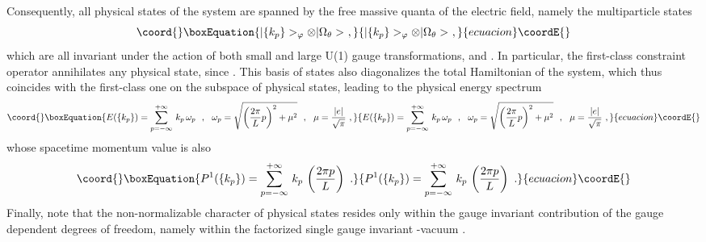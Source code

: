 \documentclass[a4paper,11pt]{article}
\begin{document}
Consequently, all physical states of the system are spanned by the
free massive quanta of the electric field, namely the multiparticle states
\begin{equation}\coord{}\boxEquation{
|\{k_p\}>_\varphi\otimes|\Omega_\theta>\ ,
}{
|\{k_p\}>_\varphi\otimes|\Omega_\theta>\ ,
}{ecuacion}\coordE{}\end{equation}
which are all invariant under the action of both small and large U(1) gauge
transformations, \coordHE{} and \coordHE{}. In particular, the first-class 
constraint ope\-ra\-tor \coordHE{} annihilates any physical state, since
\coordHE{}.
This basis of states also diagonalizes the total Hamiltonian \coordHE{} of the
system, which thus coincides with the first-class one \coordHE{} on the subspace
of physical states, leading to the physical energy spectrum
\begin{equation}\coord{}\boxEquation{
E(\{k_p\})=\sum_{p=-\infty}^{+\infty}\,k_p\,\omega_p\ \ ,\ \ 
\omega_p=\sqrt{\left(\frac{2\pi}{L}p\right)^2+\mu^2}\ \ ,\ \ 
\mu=\frac{|e|}{\sqrt{\pi}}\ ,
}{
E(\{k_p\})=\sum_{p=-\infty}^{+\infty}\,k_p\,\omega_p\ \ ,\ \ 
\omega_p=\sqrt{\left(\frac{2\pi}{L}p\right)^2+\mu^2}\ \ ,\ \ 
\mu=\frac{|e|}{\sqrt{\pi}}\ ,
}{ecuacion}\coordE{}\end{equation}
whose spacetime momentum value is also
\begin{equation}\coord{}\boxEquation{
P^1(\{k_p\})=\sum_{p=-\infty}^{+\infty}\,k_p\,\left(\frac{2\pi p}{L}\right)\ .
}{
P^1(\{k_p\})=\sum_{p=-\infty}^{+\infty}\,k_p\,\left(\frac{2\pi p}{L}\right)\ .
}{ecuacion}\coordE{}\end{equation}
Finally, note that the non-normalizable character of physical states resides
only within the gauge invariant contribution of the gauge dependent degrees
of freedom, namely within the factorized single gauge invariant
\myHighlight{$\theta$}\coordHE{}-vacuum \myHighlight{$|\Omega_\theta>$}\coordHE{}.
\end{document}
